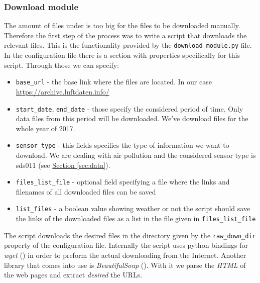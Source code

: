 \documentclass[12pt,a4paper,twoside]{scrartcl}
\numberwithin{equation}{section}
\newcommand{\refsec}[1]{\hyperref[#1]{Section \ref*{#1}}}
\begin{document}
\subsubsection{Download module}
\label{sec:down-module}
The  amount of files under \cite{datalink}  is too big for the files to be downloaded manually. Therefore the first step of the process was to write a script that downloads the relevant files. This is the functionality provided by the \texttt{download\_module.py} file. In the configuration file there is a section with properties specifically for this script. Through those we can specify:
\begin{itemize}
\item \texttt{base\_url} - the base link where the files are located. In our case \url{https://archive.luftdaten.info/}
\item \texttt{start\_date}, \texttt{end\_date} - those specify the considered period of time. Only data files from this period will be downloaded. We've download files for the whole year of 2017.
\item \texttt{sensor\_type} - this fields specifies the type of information we want to download. We are dealing with air pollution and the considered sensor type is sds011 (see \refsec{sec:data}).
\item \texttt{files\_list\_file} - optional field specifying a file where the links and filenames of all downloaded files can be saved
\item \texttt{list\_files} - a boolean value showing weather or not the script should save the links of the downloaded files as a list in the file given in \texttt{files\_list\_file}
\end{itemize}
The script downloads the desired files in the directory given by the \texttt{raw\_down\_dir} property of the configuration file. Internally the script uses python bindings for \emph{wget} (\cite{wget}) in order to preform the actual downloading from the Internet. Another library that comes into use is \emph{BeautifulSoup} (\cite{bs}). With it we parse the \emph{HTML} of the web pages and extract \emph{desired} the URLs.
\end{document}
